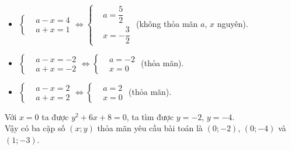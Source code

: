 \begin{ex}
{\begin{itemize}
  	\item $\left\{\begin{aligned}&a-x=4 \\&a+x=1 \end{aligned} \right. \Leftrightarrow \left\{\begin{aligned}&a=\dfrac{5}{2} \\&x=-\dfrac{3}{2} \end{aligned} \right.$ (không thỏa mãn $a$, $x$ nguyên).
  	\item $\left\{\begin{aligned}&a-x=-2 \\&a+x=-2 \end{aligned} \right. \Leftrightarrow \left\{\begin{aligned}&a=-2 \\&x=0 \end{aligned} \right.$ (thỏa mãn).
  	\item $\left\{\begin{aligned}&a-x=2 \\&a+x=2 \end{aligned} \right. \Leftrightarrow \left\{\begin{aligned}& a=2 \\&x=0 \end{aligned} \right.$ (thỏa mãn).
  \end{itemize}
  Với $x=0$ ta được $y^2+6x+8=0$, ta tìm được $y=-2$, $y=-4$.\\
  Vậy có ba cặp số $(x;y)$ thỏa mãn yêu cầu bài toán là $(0;-2)$, $(0;-4)$ và $(1;-3)$.
  }
\end{ex}


